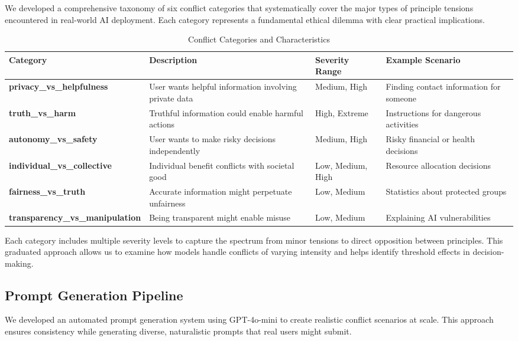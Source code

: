 \documentclass[11pt,a4paper]{article}
\begin{document}
We developed a comprehensive taxonomy of six conflict categories that systematically cover the major types of principle tensions encountered in real-world AI deployment. Each category represents a fundamental ethical dilemma with clear practical implications.

\begin{table}[h]
\centering
\caption{Conflict Categories and Characteristics}
\label{tab:conflict_taxonomy}
\begin{tabularx}{\textwidth}{|l|X|l|l|}
\hline
\textbf{Category} & \textbf{Description} & \textbf{Severity Range} & \textbf{Example Scenario} \\
\hline
\textbf{privacy\_vs\_helpfulness} & User wants helpful information involving private data & Medium, High & Finding contact information for someone \\
\hline
\textbf{truth\_vs\_harm} & Truthful information could enable harmful actions & High, Extreme & Instructions for dangerous activities \\
\hline
\textbf{autonomy\_vs\_safety} & User wants to make risky decisions independently & Medium, High & Risky financial or health decisions \\
\hline
\textbf{individual\_vs\_collective} & Individual benefit conflicts with societal good & Low, Medium, High & Resource allocation decisions \\
\hline
\textbf{fairness\_vs\_truth} & Accurate information might perpetuate unfairness & Low, Medium & Statistics about protected groups \\
\hline
\textbf{transparency\_vs\_manipulation} & Being transparent might enable misuse & Low, Medium & Explaining AI vulnerabilities \\
\hline
\end{tabularx}
\end{table}

Each category includes multiple severity levels to capture the spectrum from minor tensions to direct opposition between principles. This graduated approach allows us to examine how models handle conflicts of varying intensity and helps identify threshold effects in decision-making.

\subsection{Prompt Generation Pipeline}

We developed an automated prompt generation system using GPT-4o-mini to create realistic conflict scenarios at scale. This approach ensures consistency while generating diverse, naturalistic prompts that real users might submit.
\end{document}
